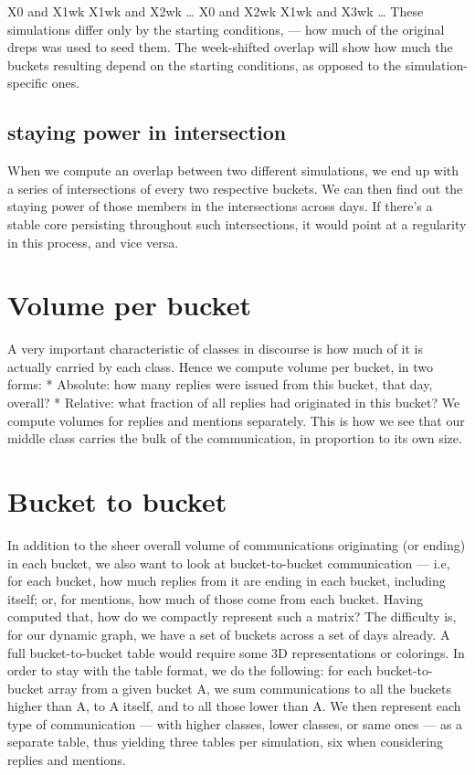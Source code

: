 \documentclass[10pt,oneside]{memoir}
\begin{document}
X0 and X1wk
X1wk and X2wk
{\ldots}
X0 and X2wk
X1wk and X3wk
{\ldots}
These simulations differ only by the starting conditions, --- how much of the original dreps was used to seed them.  The week-shifted overlap will show how much the buckets resulting depend on the starting conditions, as opposed to the simulation-specific ones.


\subsection{staying power in intersection}
\label{stayingpowerinintersection}

When we compute an overlap between two different simulations, we end up with a series of intersections of every two respective buckets.  We can then find out the staying power of those members in the intersections across days.  If there's a stable core persisting throughout such intersections, it would point at a regularity in this process, and vice versa.


\section{Volume per bucket}
\label{volumeperbucket}

A very important characteristic of classes in discourse is how much of it is actually carried by each class.  Hence we compute volume per bucket, in two forms:
* Absolute: how many replies were issued from this bucket, that day, overall?
* Relative: what fraction of all replies had originated in this bucket?
We compute volumes for replies and mentions separately.  This is how we see that our middle class carries the bulk of the communication, in proportion to its own size.  


\section{Bucket to bucket}
\label{buckettobucket}

In addition to the sheer overall volume of communications originating (or ending) in each bucket, we also want to look at bucket-to-bucket communication --- i.e, for each bucket, how much replies from it are ending in each bucket, including itself; or, for mentions, how much of those come from each bucket.
Having computed that, how do we compactly represent such a matrix?  The difficulty is, for our dynamic graph, we have a set of buckets across a set of days already.  A full bucket-to-bucket table would require some 3D representations or colorings.  In order to stay with the table format, we do the following: for each bucket-to-bucket array from a given bucket A, we sum communications to all the buckets higher than A, to A itself, and to all those lower than A.  We then represent each type of communication --- with higher classes, lower classes, or same ones --- as a separate table, thus yielding three tables per simulation, six when considering replies and mentions.
\end{document}
